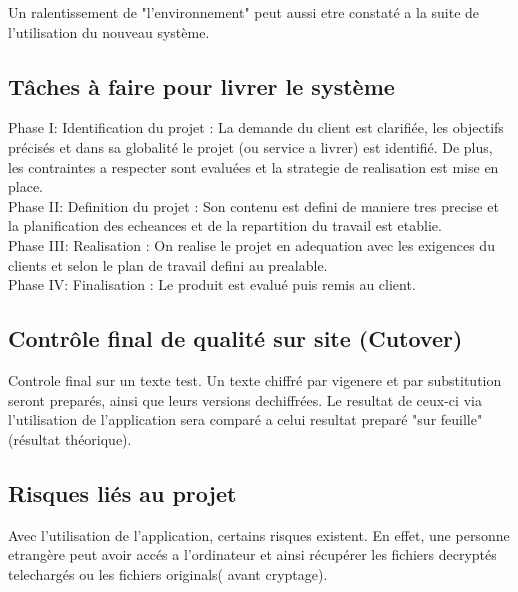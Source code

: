 \documentclass[a4]{article}
\begin{document}
		Un ralentissement de "l'environnement" peut aussi etre constaté a la suite de l'utilisation du nouveau 			système.
		\subsection{Tâches à faire pour livrer le système}
		Phase I: Identification du projet : La demande du client est clarifiée, les objectifs précisés et dans sa 			globalité le projet (ou service a livrer) est identifié. De plus, les contraintes a respecter sont 				evaluées et la strategie de realisation est mise en place.\\
		Phase II: Definition du projet : Son contenu est defini de maniere tres precise et la planification des 			echeances et de la repartition du travail est etablie.\\
		Phase III: Realisation : On realise le projet en adequation avec les exigences du clients et selon le plan de 			travail defini au prealable.\\
		Phase IV: Finalisation : Le produit est evalué puis remis au client.
		
		
		
		\subsection{Contrôle final de qualité sur site (Cutover)}
		Controle final sur un texte test. Un texte chiffré par vigenere et par substitution seront preparés, ainsi que 			leurs versions dechiffrées. Le resultat de ceux-ci via l'utilisation de l'application sera comparé a celui resultat 				preparé "sur feuille"(résultat théorique). 
		\subsection{Risques liés au projet}
		Avec l'utilisation de l'application, certains risques existent. En effet, une personne etrangère peut avoir 			accés a l'ordinateur et ainsi récupérer les fichiers decryptés telechargés ou les fichiers originals( avant cryptage).
\end{document}
